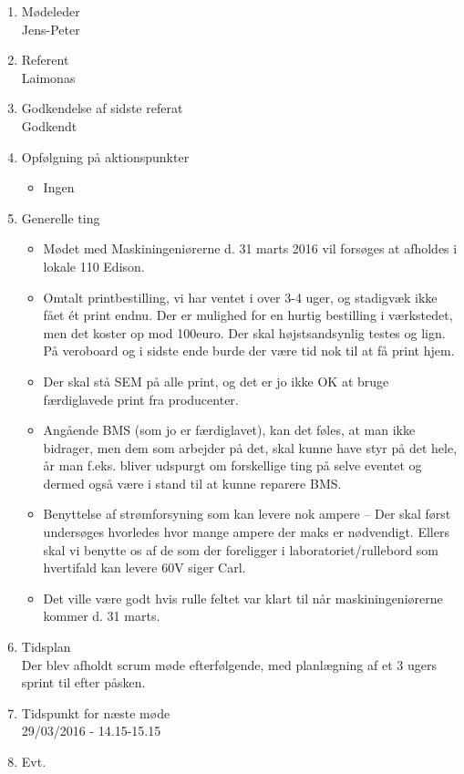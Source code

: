 	\begin{enumerate}
		\itemsep 0.3em 
		\item Mødeleder\\
			Jens-Peter
		\item Referent\\
			Laimonas
		\item Godkendelse af sidste referat\\
			Godkendt

		\item Opfølgning på aktionspunkter
		\begin{itemize}
			\itemsep 0.3em 
			\item Ingen
		\end{itemize}
		\item Generelle ting\\
			
		\begin{itemize}
			\itemsep 0.3em 
			\item Mødet med Maskiningeniørerne d. 31 marts 2016 vil forsøges at afholdes i lokale 110 Edison.
			\item Omtalt printbestilling, vi har ventet i over 3-4 uger, og stadigvæk ikke fået ét print endnu. Der er mulighed for en hurtig bestilling i værkstedet, men det koster op mod 100euro. 
			Der skal højstsandsynlig testes og lign. På veroboard og i sidste ende burde der være tid nok til at få print hjem. 
			\item Der skal stå SEM på alle print, og det er jo ikke OK at bruge færdiglavede print fra producenter.
			\item Angående BMS (som jo er færdiglavet), kan det føles, at man ikke bidrager, men dem som arbejder på det, skal kunne have styr på det hele, år man f.eks. bliver udspurgt om forskellige ting på selve eventet og dermed også være i stand til at kunne reparere BMS. 
			\item Benyttelse af strømforsyning som kan levere nok ampere – Der skal først undersøges hvorledes hvor mange ampere der maks er nødvendigt. Ellers skal vi benytte os af de som der foreligger i laboratoriet/rullebord som hvertifald kan levere 60V siger Carl.
			\item Det ville være godt hvis rulle feltet var klart til når maskiningeniørerne kommer d. 31 marts. 
			
		\end{itemize}			
			
		\item Tidsplan\\
			Der blev afholdt scrum møde efterfølgende, med planlægning af et 3 ugers sprint til efter påsken. 

		\item Tidspunkt for næste møde\\
			29/03/2016 - 14.15-15.15
		\item Evt.
	\end{enumerate}
